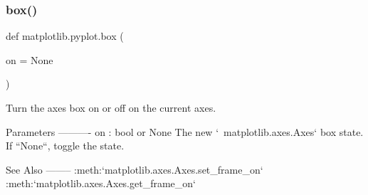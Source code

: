 \subsubsection{\texorpdfstring{box()}{box()}}
{\footnotesize\ttfamily def matplotlib.\+pyplot.\+box (\begin{DoxyParamCaption}\item[{}]{on = {\ttfamily None} }\end{DoxyParamCaption})}

\begin{DoxyVerb}Turn the axes box on or off on the current axes.

Parameters
----------
on : bool or None
    The new `~matplotlib.axes.Axes` box state. If ``None``, toggle
    the state.

See Also
--------
:meth:`matplotlib.axes.Axes.set_frame_on`
:meth:`matplotlib.axes.Axes.get_frame_on`
\end{DoxyVerb}
 \mbox{\label{namespacematplotlib_1_1pyplot_a2eb6699379c1b50a38619452740bd78c}} 
